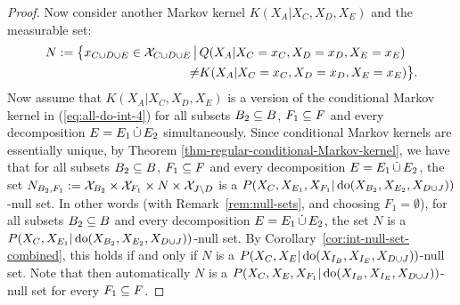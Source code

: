 \begin{proof}
Now consider another Markov kernel $K(X_A|X_C,X_D,X_E)$ and the measurable set:
\begin{align*}
  N := \bigl\{ x_{C \cup D \cup E} \in \mathcal{X}_{C \cup D \cup E} \,\big|\, & Q(X_A|X_C=x_C,X_D=x_D,X_E=x_E) \\ 
                                                                    \neq & K(X_A|X_C=x_C,X_D=x_D,X_E=x_E)  \bigr\}.
\end{align*}
Now assume that $K(X_A|X_C,X_D,X_E)$ is a version of the conditional Markov kernel in (\ref{eq:all-do-int-4}) for all subsets $B_2 \subseteq B$, $F_1 \subseteq F$ and every decomposition $E=E_1 \,\dot{\cup}\, E_2$ simultaneously. 
Since conditional Markov kernels are essentially unique, by Theorem \ref{thm-regular-conditional-Markov-kernel}, we have that for all subsets $B_2 \subseteq B$, $F_1 \subseteq F$ and every decomposition $E=E_1 \,\dot{\cup}\, E_2$, the set $N_{B_2,F_1} := \mathcal{X}_{B_2} \times \mathcal{X}_{F_1} \times N \times \mathcal{X}_{J \setminus D}$ is a $P(X_C,X_{E_1},X_{F_1}|\operatorname{do}(X_{B_2},X_{E_2},X_{D\cup J}))$-null set. 
In other words (with Remark~\ref{rem:null-sets}, and choosing $F_1 = \emptyset$), for all subsets $B_2 \subseteq B$ and every decomposition $E=E_1 \,\dot{\cup}\, E_2$, the set $N$ is a $P(X_C,X_{E_1}|\operatorname{do}(X_{B_2},X_{E_2},X_{D\cup J}))$-null set. 
By Corollary~\ref{cor:int-null-set-combined}, this holds if and only if $N$ is a $P(X_C,X_E|\operatorname{do}(X_{I_B},X_{I_E},X_{D\cup J}))$-null set.
Note that then automatically $N$ is a $P(X_C,X_E,X_{F_1}|\operatorname{do}(X_{I_B},X_{I_E},X_{D\cup J}))$-null set for every $F_1 \subseteq F$. 

\end{proof}
